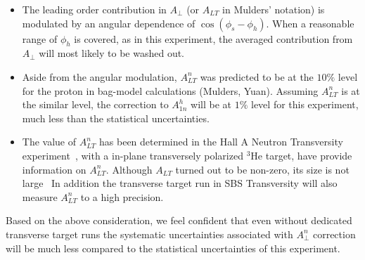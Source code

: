 \begin{itemize}
    \item  The leading order contribution in $A_{\perp}$ (or $A_{LT}$ in Mulders' notation)  
           is modulated by an angular dependence of $ \cos(\phi_s - \phi_h)$.
           When a reasonable range of $\phi_h$ is covered,  as in this experiment, 
           the averaged contribution from $A_{\perp}$ will most likely to be washed out.
 
    \item  Aside from the angular modulation, $A^n_{LT}$  was predicted to be at 
           the $10 \%$ level for the proton in bag-model calculations (Mulders, Yuan).
           Assuming $A^n_{LT}$ is at the similar level, the correction to $A_{1n}^h$
           will be at $1 \%$ level for this experiment, much less than the 
           statistical uncertainties.    
             
    \item  The value of $A^n_{LT}$ has been determined in the Hall A Neutron
           Transversity experiment~\cite{E06010_ALT_PRL}, with a in-plane transversely polarized $^3$He target, have provide
            information on $A^n_{LT}$.    Although $A_{LT}$ turned out to be non-zero,  its size is not large~\cite{E06010_ALT_PRL}
            In addition the transverse target run in SBS Transversity will also measure $A^n_{LT}$ to a high precision.
\end{itemize}  

Based on the above consideration,  we feel confident that 
even without dedicated transverse target runs the systematic 
uncertainties associated with $A^n_{\perp}$ correction 
will be much less compared to the statistical uncertainties of this experiment. 

